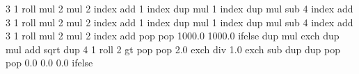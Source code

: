 {{  3 1 roll
  mul 2 mul       %
  2 index add     %
  1 index dup mul %
  1 index dup mul %
  sub             %
  4 index add     %
  3 1 roll
  mul 2 mul       %
  2 index add     %
  1 index dup mul %
  1 index dup mul %
  sub             %
  4 index add     %
  3 1 roll
  mul 2 mul       %
  2 index add     %
  } { pop pop 1000.0 1000.0 } ifelse
  dup mul exch
  dup mul 
  add sqrt
  dup 4 1 roll
  2 gt { pop pop 2.0 exch div 1.0 exch sub dup dup} {pop pop 0.0 0.0 0.0} ifelse
}
